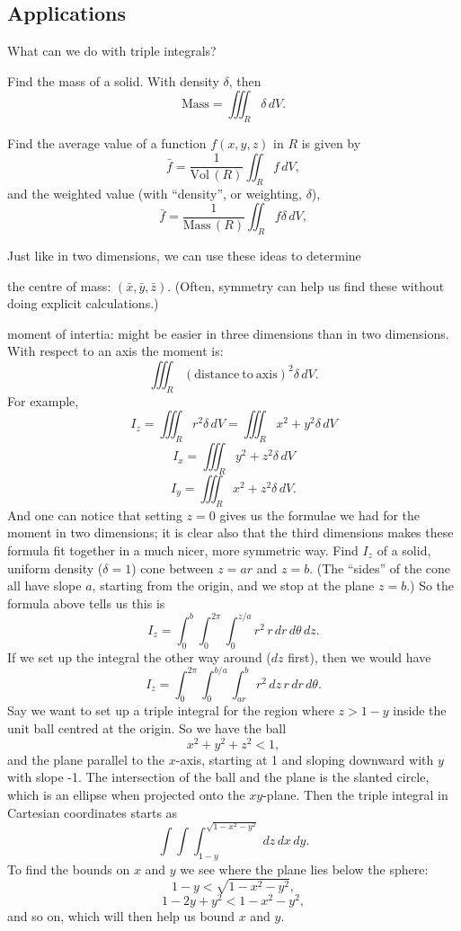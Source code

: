 \subsection{Applications}
What can we do with triple integrals?
\ben
\item Find the mass of a solid. With density $\delta$, then
\[ \mathrm{Mass} = \iiint_R \delta \, dV. \]
\item Find the average value of a function $f(x,y,z)$ in $R$ is given by
\[ \bar{f} = \frac 1 {\mathrm{Vol}\,(R)} \iint_R f \, dV, \]
and the weighted value (with ``density'', or weighting, $\delta$),
\[ \bar{f} = \frac 1 {\mathrm{Mass}\,(R)} \iint_R f \delta \, dV, \]

Just like in two dimensions, we can use these ideas to determine
\ben
\item the centre of mass: $(\bar{x},\bar{y},\bar{z})$. (Often, symmetry can help us find these without doing explicit calculations.)
\item moment of intertia: might be easier in three dimensions than in two dimensions. With respect to an axis the moment is:
\[ \iiint_R (\mathrm{distance\ to\ axis})^2\delta \, dV. \]
For example,
\[ I_z = \iiint_R r^2 \delta \,dV = \iiint_R x^2 + y^2 \delta \,dV \]
\[ I_x = \iiint_R y^2 + z^2 \delta \,dV \]
\[ I_y = \iiint_R x^2 + z^2 \delta \,dV. \]
And one can notice that setting $z=0$ gives us the formulae we had for the moment in two dimensions; it is clear also that the third dimensions makes these formula fit together in a much nicer, more symmetric way.
\een
\bex
Find $I_z$ of a solid, uniform density ($\delta = 1$) cone between $z = ar$ and $z = b$. (The ``sides'' of the cone all have slope $a$, starting from the origin, and we stop at the plane $z = b$.) So the formula above tells us this is
\[ I_z = \int_0^b \int_0^{2\pi} \int_0^{z/a} r^2 \, r \, dr \, d\theta \, dz. \]
If we set up the integral the other way around ($dz$ first), then we would have
\[ I_z = \int_0^{2\pi} \int_0^{b/a} \int_{ar}^{b} r^2 \, dz \, r \, dr \, d\theta. \]
\eex
\bex
Say we want to set up a triple integral for the region where $z > 1 - y$ inside the unit ball centred at the origin. So we have the ball
\[ x^2 + y^2 + z^2 < 1, \]
and the plane parallel to the $x$-axis, starting at 1 and sloping downward with $y$ with slope -1. The intersection of the ball and the plane is the slanted circle, which is an ellipse when projected onto the $xy$-plane. Then the triple integral in Cartesian coordinates starts as
\[ \int \int \int_{1-y}^{\sqrt{1-x^2-y^2}} \,dz \,dx \, dy. \]
To find the bounds on $x$ and $y$ we see where the plane lies below the sphere:
\[ 1 - y < \sqrt{1-x^2-y^2}, \]
\[ 1 - 2y + y^2 < 1 - x^2 - y^2, \]
and so on, which will then help us bound $x$ and $y$.
\eex
\een